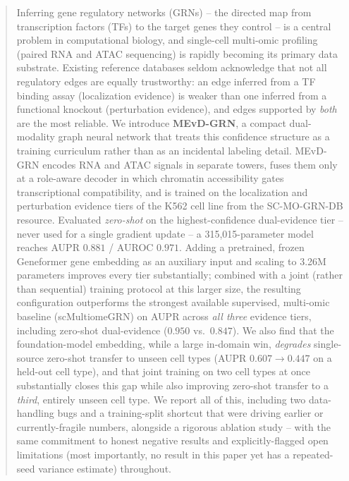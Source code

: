 \documentclass{article}
\theoremstyle{plain}
\theoremstyle{definition}
\begin{document}
\begin{abstract}
Inferring gene regulatory networks (GRNs) -- the directed map from transcription
factors (TFs) to the target genes they control -- is a central problem in
computational biology, and single-cell multi-omic profiling (paired RNA and ATAC
sequencing) is rapidly becoming its primary data substrate. Existing reference
databases seldom acknowledge that not all regulatory edges are equally trustworthy:
an edge inferred from a TF binding assay (localization evidence) is weaker than one
inferred from a functional knockout (perturbation evidence), and edges supported by
\emph{both} are the most reliable. We introduce \textbf{MEvD-GRN}, a compact
dual-modality graph neural network that treats this confidence structure as a
training curriculum rather than as an incidental labeling detail. MEvD-GRN encodes
RNA and ATAC signals in separate towers, fuses them only at a role-aware decoder in
which chromatin accessibility gates transcriptional compatibility, and is trained
on the localization and perturbation evidence tiers of the K562 cell line from the
SC-MO-GRN-DB resource. Evaluated \emph{zero-shot} on the highest-confidence
dual-evidence tier -- never used for a single gradient update -- a
315,015-parameter model reaches AUPR $0.881$ / AUROC $0.971$. Adding a pretrained,
frozen Geneformer gene embedding as an auxiliary input and scaling to 3.26M
parameters improves every tier substantially; combined with a joint (rather than
sequential) training protocol at this larger size, the resulting configuration
outperforms the strongest available supervised, multi-omic baseline
(scMultiomeGRN) on AUPR across \emph{all three} evidence tiers, including
zero-shot dual-evidence ($0.950$ vs.\ $0.847$). We also find that the foundation-model
embedding, while a large in-domain win, \emph{degrades} single-source zero-shot
transfer to unseen cell types (AUPR $0.607{\to}0.447$ on a held-out cell type), and
that joint training on two cell types at once substantially closes this gap while
also improving zero-shot transfer to a \emph{third}, entirely unseen cell type. We
report all of this, including two data-handling bugs and a training-split
shortcut that were driving earlier or currently-fragile numbers, alongside a
rigorous ablation study -- with the same commitment to honest negative results and
explicitly-flagged open limitations (most importantly, no result in this paper yet
has a repeated-seed variance estimate) throughout.
\end{abstract}
\end{document}

